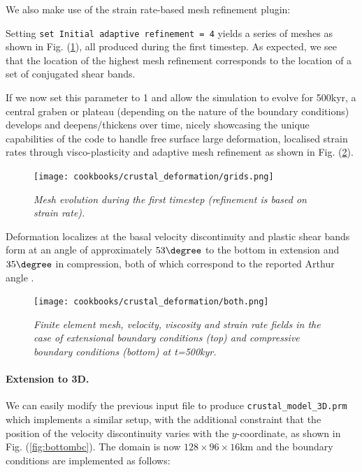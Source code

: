 \documentclass{article}
\begin{document}


We also make use of the strain rate-based mesh refinement plugin:



Setting 
{\tt   set Initial adaptive refinement        = 4}
yields a series of meshes as shown in Fig. (\ref{fig:meshes}), all produced during the 
first timestep. As expected, we see that the location of the highest mesh refinement
corresponds to the location of a set of conjugated shear bands.

If we now set this parameter to 1 and allow the simulation to evolve
for 500kyr, a central graben or plateau (depending on the nature
of the boundary conditions) develops and deepens/thickens over time, nicely showcasing 
the unique capabilities of the code to handle free surface large deformation, localised
strain rates through visco-plasticity and adaptive mesh refinement as
shown in Fig. (\ref{fig:extcompr}).

\begin{figure}
   \centering
   \texttt{[image: cookbooks/crustal\_deformation/grids.png]}
   \caption{\it Mesh evolution during the first timestep (refinement is based on strain rate).}
   \label{fig:meshes}
\end{figure}

 

Deformation localizes at the basal velocity discontinuity and plastic shear bands
form at an angle of approximately $53\degree$ to the bottom in extension and 
$35\degree$ in compression, both of which correspond to the reported Arthur angle \cite{kaus10,buit12}. 

\begin{figure}
  \centering
  \texttt{[image: cookbooks/crustal\_deformation/both.png]}
  \caption{\it Finite element mesh, velocity, viscosity and strain rate fields
  in the case of extensional boundary conditions (top) and compressive boundary conditions (bottom) at t=500kyr.}
  \label{fig:extcompr}
\end{figure}



\paragraph{Extension to 3D.} We can easily modify the previous 
input file to produce {\tt crustal\_model\_3D.prm}
which implements a similar setup, with the additional constraint that the position 
of the velocity discontinuity varies with the $y$-coordinate, 
as shown in Fig. (\ref{fig:bottombc}). 
The domain is now 
$128\times96\times16$km and the boundary conditions are implemented as
follows:
\end{document}
